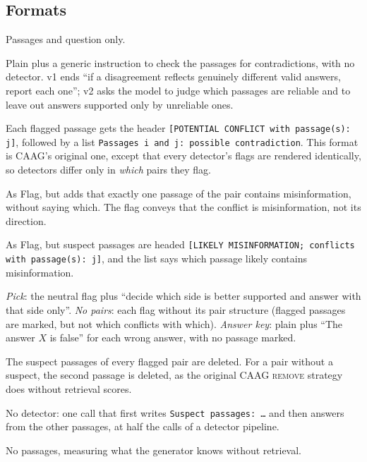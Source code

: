 \subsection{Formats}
\label{sec:formats}
\begin{description}[leftmargin=0pt,itemsep=1pt,topsep=2pt]
\item[No flags (plain).] Passages and question only.
\item[Instruction.] Plain plus a generic instruction to check the passages for contradictions, with no detector.
v1 ends ``if a disagreement reflects genuinely different valid answers, report each one''; v2 asks the model to
judge which passages are reliable and to leave out answers supported only by unreliable ones.
\item[Flag (neutral).] Each flagged passage gets the header \texttt{[POTENTIAL CONFLICT with passage(s): j]}, followed by a list
\texttt{Passages i and j: possible contradiction}. This format is CAAG's original one, except that every detector's
flags are rendered identically, so detectors differ only in \emph{which} pairs they flag.
\item[One-wrong flag.] As Flag, but adds that exactly one passage of the pair contains misinformation, without saying
which. The flag conveys that the conflict is misinformation, not its direction.
\item[Directional flag.] As Flag, but suspect passages are headed \texttt{[LIKELY MISINFORMATION; conflicts with
passage(s): j]}, and the list says which passage likely contains misinformation.
\item[Controls.] \emph{Pick}: the neutral flag plus ``decide which side is better supported and answer with that
side only''. \emph{No pairs}: each flag without its pair structure (flagged passages are marked, but not which conflicts
with which). \emph{Answer key}: plain plus ``The answer $X$ is false'' for each wrong answer, with no passage marked.
\item[Remove (suspect).] The suspect passages of every flagged pair are deleted. For a pair without a suspect, the
second passage is deleted, as the original CAAG \textsc{remove} strategy does without retrieval scores.
\item[Single call.] No detector: one call that first writes \texttt{Suspect passages: \dots} and then answers from
the other passages, at half the calls of a detector pipeline.
\item[Closed book.] No passages, measuring what the generator knows without retrieval.
\end{description}

